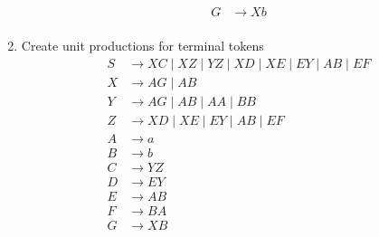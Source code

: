 \documentclass[../Document.tex]{subfiles}
\begin{document}
\begin{enumerate}
\begin{align*}
            G &\rightarrow Xb\\
        \end{align*}
    \item Create unit productions for terminal tokens
        \begin{align*}
            S &\rightarrow XC \mid XZ \mid YZ \mid XD \mid XE \mid EY \mid AB \mid EF\\
            X &\rightarrow AG \mid AB\\
            Y &\rightarrow AG \mid AB \mid AA \mid BB\\
            Z &\rightarrow XD \mid XE \mid EY \mid AB \mid EF\\
            A &\rightarrow a\\
            B &\rightarrow b\\
            C &\rightarrow YZ\\
            D &\rightarrow EY\\
            E &\rightarrow AB\\
            F &\rightarrow BA\\
            G &\rightarrow XB\\
        \end{align*}
\end{enumerate}
\end{document}
